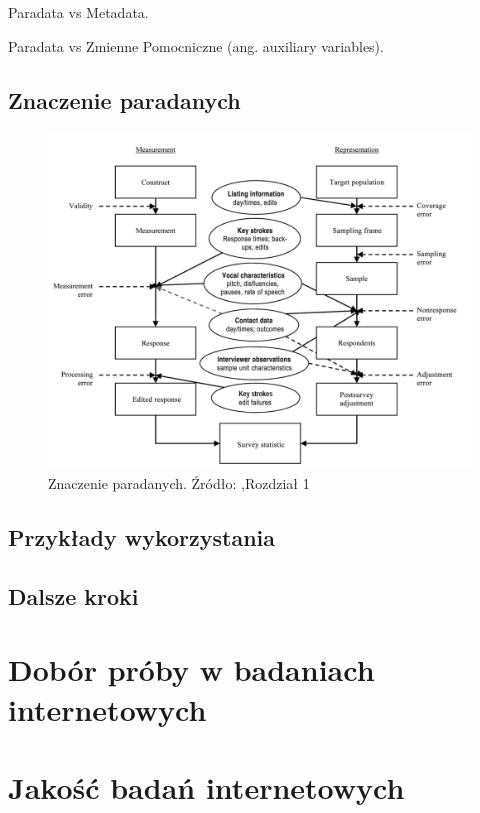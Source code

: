 \documentclass[]{book}
\begin{document}
Paradata vs Metadata.

Paradata vs Zmienne Pomocniczne (ang. auxiliary variables).

\section{Znaczenie paradanych}\label{znaczenie-paradanych}

\begin{figure}[htbp]
\centering
\includegraphics{imgs/paradata-tse.png}
\caption{Znaczenie paradanych. Źródło:
\citet{kreuter2013improving},Rozdział 1}
\end{figure}

\section{Przykłady wykorzystania}\label{przykady-wykorzystania}

\section{Dalsze kroki}\label{dalsze-kroki}

\chapter{Dobór próby w badaniach
internetowych}\label{dobor-proby-w-badaniach-internetowych}

\chapter{Jakość badań internetowych}\label{jakosc-badan-internetowych}
\end{document}
